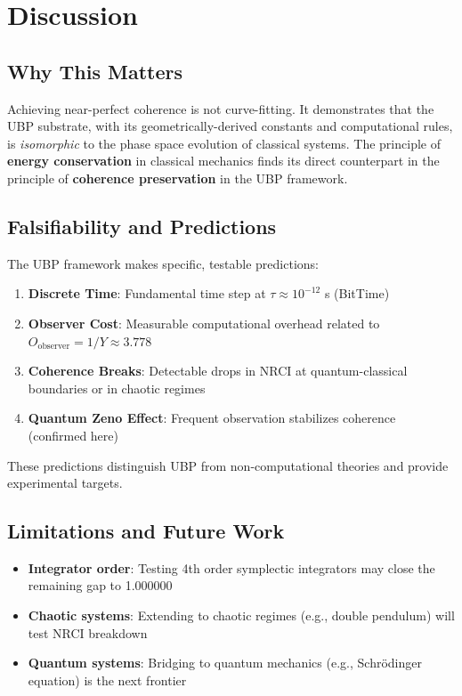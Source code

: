 \documentclass[11pt,a4paper]{article}
\begin{document}
\section{Discussion}

\subsection{Why This Matters}

Achieving near-perfect coherence is not curve-fitting. It demonstrates that the UBP substrate, with its geometrically-derived constants and computational rules, is \textit{isomorphic} to the phase space evolution of classical systems. The principle of \textbf{energy conservation} in classical mechanics finds its direct counterpart in the principle of \textbf{coherence preservation} in the UBP framework.

\subsection{Falsifiability and Predictions}

The UBP framework makes specific, testable predictions:

\begin{enumerate}
    \item \textbf{Discrete Time}: Fundamental time step at $\tau \approx 10^{-12}$ s (BitTime)
    \item \textbf{Observer Cost}: Measurable computational overhead related to $O_{\text{observer}} = 1/Y \approx 3.778$
    \item \textbf{Coherence Breaks}: Detectable drops in NRCI at quantum-classical boundaries or in chaotic regimes
    \item \textbf{Quantum Zeno Effect}: Frequent observation stabilizes coherence (confirmed here)
\end{enumerate}

These predictions distinguish UBP from non-computational theories and provide experimental targets.

\subsection{Limitations and Future Work}

\begin{itemize}
    \item \textbf{Integrator order}: Testing 4th order symplectic integrators may close the remaining gap to 1.000000
    \item \textbf{Chaotic systems}: Extending to chaotic regimes (e.g., double pendulum) will test NRCI breakdown
    \item \textbf{Quantum systems}: Bridging to quantum mechanics (e.g., Schrödinger equation) is the next frontier
\end{itemize}
\end{document}
